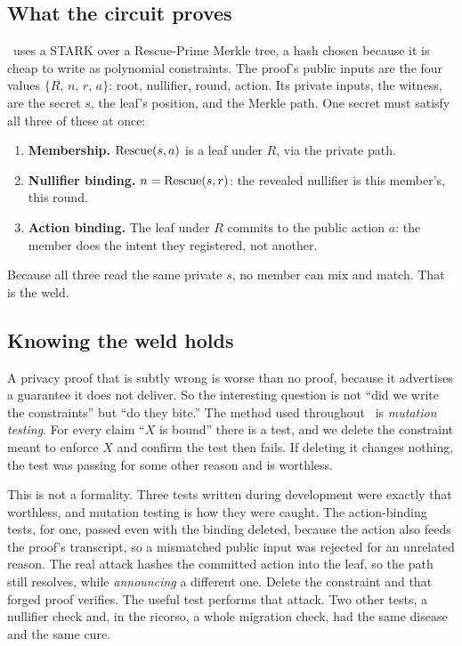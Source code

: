 \documentclass[11pt]{article}
\begin{document}
\subsection{What the circuit proves}

\river\ uses a STARK over a Rescue-Prime \cite{rescueprime} Merkle tree, a hash chosen
because it is cheap to write as polynomial constraints. The proof's public inputs are
the four values $\{R,\,n,\,r,\,a\}$: root, nullifier, round, action. Its private inputs,
the witness, are the secret $s$, the leaf's position, and the Merkle path. One secret
must satisfy all three of these at once:

\begin{enumerate}[leftmargin=1.5em,itemsep=0.1em]
\item \textbf{Membership.} $\mathrm{Rescue}(s, a)$ is a leaf under $R$, via the private path.
\item \textbf{Nullifier binding.} $n = \mathrm{Rescue}(s, r)$: the revealed nullifier is this
      member's, this round.
\item \textbf{Action binding.} The leaf under $R$ commits to the public action $a$: the
      member does the intent they registered, not another.
\end{enumerate}

Because all three read the same private $s$, no member can mix and match. That is the
weld.

\subsection{Knowing the weld holds}

A privacy proof that is subtly wrong is worse than no proof, because it advertises a
guarantee it does not deliver. So the interesting question is not ``did we write the
constraints'' but ``do they bite.'' The method used throughout \river\ is \emph{mutation
testing}. For every claim ``$X$ is bound'' there is a test, and we delete the constraint
meant to enforce $X$ and confirm the test then fails. If deleting it changes nothing,
the test was passing for some other reason and is worthless.

This is not a formality. Three tests written during development were exactly that
worthless, and mutation testing is how they were caught. The action-binding tests, for
one, passed even with the binding deleted, because the action also feeds the proof's
transcript, so a mismatched public input was rejected for an unrelated reason. The real
attack hashes the committed action into the leaf, so the path still resolves, while
\emph{announcing} a different one. Delete the constraint and that forged proof verifies.
The useful test performs that attack. Two other tests, a nullifier check and, in the
ricorso, a whole migration check, had the same disease and the same cure.
\end{document}
